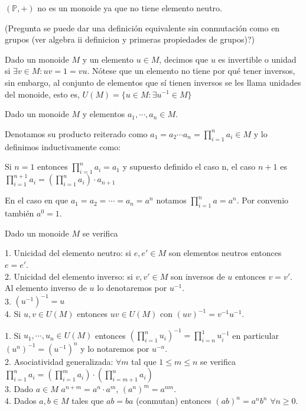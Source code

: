 \begin{example}[No monoide]
$(\mathbb{P},+)$ no es un monoide ya que no tiene elemento neutro.
\end{example}

(Pregunta se puede dar una definición equivalente sin conmutación como en grupos (ver algebra ii definicion y primeras propiedades de grupos)?)

\begin{definition}
Dado un monoide $M$ y un elemento $u \in M$, decimos que $u$ es invertible o unidad si $\exists v \in M:uv = 1 = vu$. Nótese que un elemento no tiene por qué tener inversos, sin embargo, al conjunto de elementos que sí tienen inversos se les llama unidades del monoide, esto es, $U(M) = \{u \in M: \exists u^{-1} \in M\}$
\end{definition}

\begin{definition}
Dado un monoide $M$ y elementos $a_1,\cdots,a_n \in M$.

Denotamos su producto reiterado como $a_1 = a_2 \cdots a_n = \prod_{i=1}^{n} a_i \in M$ y lo definimos inductivamente como: 

Si $n = 1$ entonces $\prod_{i=1}^{n} a_i = a_1$ y supuesto definido el caso n, el caso $n+1$ es $\prod_{i=1}^{n+1} a_i = (\prod_{i=1}^{n} a_i)\cdot a_{n+1}$

En el caso en que $a_1 = a_2 = \cdots = a_n = a^n$ notamos $\prod_{i=1}^{n} a = a^n$. Por convenio también $a^0 = 1$.
\end{definition}

\begin{proposition}
Dado un monoide $M$ se verifica

1. Unicidad del elemento neutro: si $e,e' \in M$ son elementos neutros entonces $e = e'$.\\
2. Unicidad del elemento inverso: si $v,v' \in M$ son inversos de $u$ entonces $v = v'$. Al elemento inverso de $u$ lo denotaremos por $u^{-1}$.\\
3. $(u^{-1})^{-1} = u$\\
4. Si $u,v \in U(M)$ entonces $uv \in U(M)$ con $(uv)^{-1} = v^{-1}u^{-1}$. 
\end{proposition}

\begin{proposition}
	1. Si $u_1,\cdots,u_n \in U(M)$ entonces $(\prod_{i=1}^{n} u_i)^{-1} = \prod_{i=n}^{1} u_i^{-1}$ en particular $(u^n)^{-1} = (u^{-1})^n$ y lo notaremos por $u^{-n}$.\\
	2. Asociatividad generalizada: $\forall m$ tal que $1 \leq m \leq n$ se verifica $\prod_{i=1}^{n} a_i = (\prod_{i=1}^{m} a_i) \cdot (\prod_{i=m+1}^{n} a_i)$\\
	3. Dado $a \in M$ $a^{n+m} = a^n \cdot a^m$, $(a^n)^m = a^{nm}$. \\
	4. Dados $a,b \in M$ tales que $ab = ba$ (conmutan) entonces $(ab)^n = a^nb^n$ $\forall n \ge 0$.
\end{proposition}

